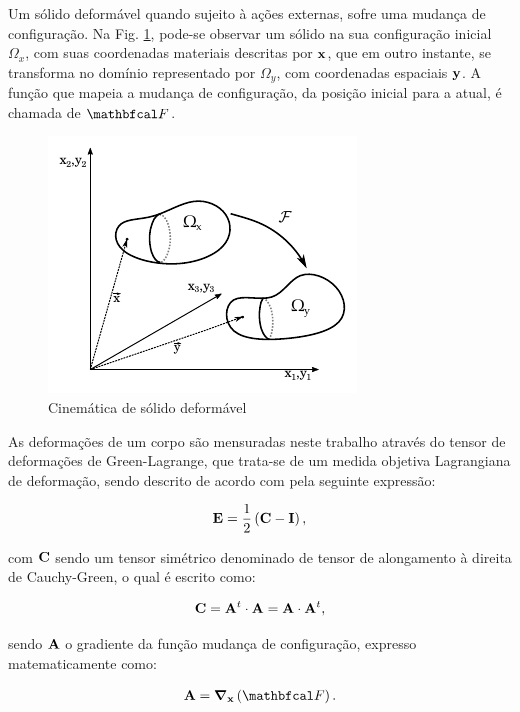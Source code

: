 \documentclass[tese_patricia]{subfiles}
\begin{document}
Um sólido deformável quando sujeito à ações externas, sofre uma mudança de configuração. Na Fig. \ref{fig:CinSol}, pode-se observar um sólido na sua configuração inicial $\Omega_{x}$, com suas coordenadas materiais descritas por $\mathbf{x}$, que em outro instante, se transforma no domínio representado por $\Omega_{y}$, com coordenadas espaciais $\mathbf{y}$. A função que mapeia a mudança de configuração, da posição inicial para a atual, é chamada de $\deformation$.

\begin{figure}[htb!]
	\centering
	\includegraphics[scale=1.7]{Imagens/Cap3/cinematica.pdf}	
	\caption{Cinemática de sólido deformável}
	\label{fig:CinSol}
\end{figure}

As deformações de um corpo são mensuradas neste trabalho através do tensor de deformações de Green-Lagrange, que trata-se de um medida objetiva Lagrangiana de deformação, sendo descrito de acordo com  pela seguinte expressão: 

\begin{align}
\mathbf{E} = \frac{1}{2}\left(\mathbf{C} - \mathbf{I}\right),
\end{align}

\noindent com $\mathbf{C}$ sendo um tensor simétrico denominado de tensor de alongamento à direita de Cauchy-Green, o qual é escrito como:

\begin{align}
\mathbf{C} = \mathbf{A}^{t} \cdot \mathbf{A} =  \mathbf{A} \cdot \mathbf{A}^{t} ,
\end{align}

\noindent sendo $ \mathbf{A}$ o gradiente da função mudança de configuração, expresso matematicamente como:

\begin{align}
\gradDeformation = \lGrad\left(\deformation\right).
\end{align}
\end{document}
